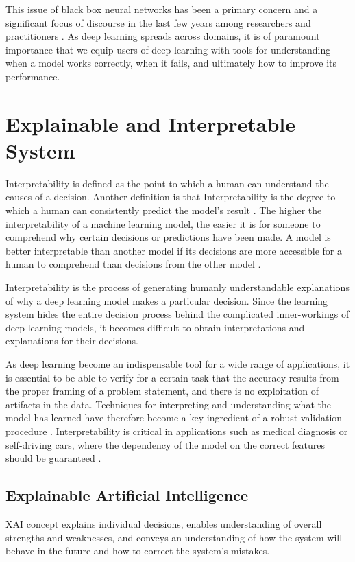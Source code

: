 This issue of black box neural networks has been a primary concern and a significant focus of discourse in the last few years among researchers and practitioners \cite{Samek}. As deep learning spreads across domains, it is of paramount importance that we equip users of deep learning with tools for understanding when a model works correctly, when it fails, and ultimately how to improve its performance.

\section{Explainable and Interpretable System}

Interpretability is defined as the point to which a human can understand the causes of a decision. Another definition is that Interpretability is the degree to which a human can consistently predict the model’s result \cite{molnar}. The higher the interpretability of a machine learning model, the easier it is for someone to comprehend why certain decisions or predictions have been made. A model is better interpretable than another model if its decisions are more accessible for a human to comprehend than decisions from the other model \cite{molnar}.
    
Interpretability is the process of generating humanly understandable explanations of why a deep learning model makes a particular decision. Since the learning system hides the entire decision process behind the complicated inner-workings of deep learning models, it becomes difficult to obtain interpretations and explanations for their decisions.

As deep learning become an indispensable tool for a wide range of applications, it is essential to be able to verify for a certain task that the accuracy results from the proper framing of a problem statement, and there is no exploitation of artifacts in the data. Techniques for interpreting and understanding what the model has learned have therefore become a key ingredient of a robust validation procedure \citep{taylor2006methods} \citep{hansen2011visual} \citep{bach2015pixel}. Interpretability is critical in applications such as medical diagnosis or self-driving cars, where the dependency of the model on the correct features should be guaranteed \citep{Caruana:2015:IMH:2783258.2788613} \citep{bojarski2017explaining}.

\subsection{Explainable Artificial Intelligence}
XAI concept explains individual decisions, enables understanding of overall strengths and weaknesses, and conveys an understanding of how the system will behave in the future and how to correct the system’s mistakes.

